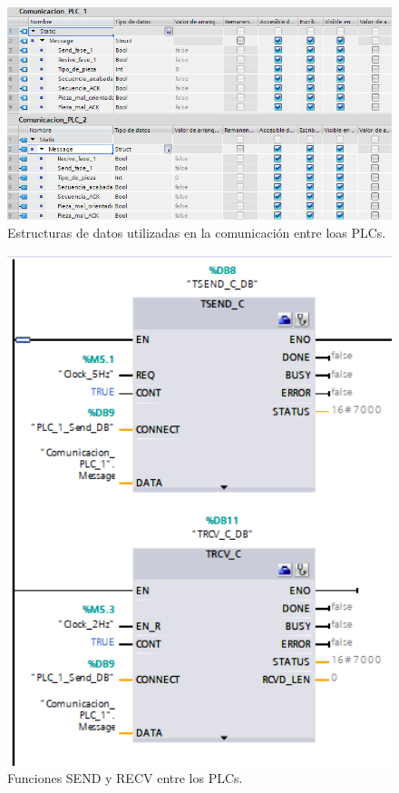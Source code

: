 \begin{figure} [h!]
  \begin{center}
    \includegraphics[width=16cm]{figs/estructura_com_plcs}
  \end{center}
  \caption{\centering Estructuras de datos utilizadas en la comunicación entre loas PLCs.}
  \label{fig:estructura_com_plcs}
\end{figure} 

\clearpage

\begin{figure} [h!]
  \begin{center}
    \includegraphics[width=12cm]{figs/comunicacion_plcs}
  \end{center}
  \caption{\centering Funciones SEND y RECV entre los PLCs.}
  \label{fig:comunicacion_plcs}
\end{figure} 

